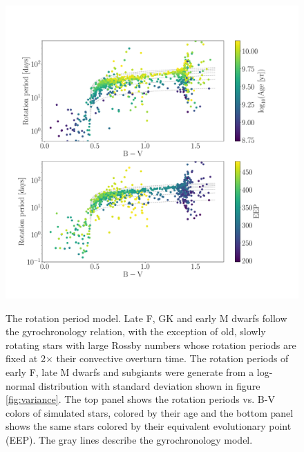 \begin{figure}
  \caption{
The rotation period model.
Late F, GK and early M dwarfs follow the \citet{angus2015} gyrochronology
relation, with the exception of old, slowly rotating stars with large Rossby
numbers whose rotation periods are fixed at 2$\times$ their convective
overturn time.
The rotation periods of early F, late M dwarfs and subgiants were generate
    from a log-normal distribution with standard deviation shown in figure
    \ref{fig:variance}.
The top panel shows the rotation periods vs. B-V colors of simulated stars,
    colored by their age and the bottom panel shows the same stars colored
    by their equivalent evolutionary point (EEP).
    The gray lines describe the \citep{angus2015} gyrochronology model.
}
  \centering
    \includegraphics[width=1.\textwidth]{rotation_model}
\label{fig:rotation_model}
\end{figure}


